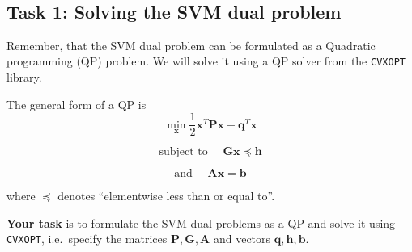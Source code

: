 \documentclass{article}
\begin{document}
    \begin{center}
    \end{center}
    { \hspace*{\fill} \\}
    
    \hypertarget{task-1-solving-the-svm-dual-problem}{%
\subsection{Task 1: Solving the SVM dual
problem}\label{task-1-solving-the-svm-dual-problem}}

    Remember, that the SVM dual problem can be formulated as a Quadratic
programming (QP) problem. We will solve it using a QP solver from the
\texttt{CVXOPT} library.

The general form of a QP is
\[\min_{\mathbf{x}} \frac{1}{2}\mathbf{x}^T \mathbf{P} \mathbf{x} + \mathbf{q}^T \mathbf{x}\]

\[\text{subject to } \quad \mathbf{G}\mathbf{x} \preceq \mathbf{h}\]

\[\text{and } \quad \mathbf{A}\mathbf{x} = \mathbf{b}\]

where \(\preceq\) denotes ``elementwise less than or equal to''.

\textbf{Your task} is to formulate the SVM dual problems as a QP and
solve it using \texttt{CVXOPT}, i.e.~specify the matrices
\(\mathbf{P}, \mathbf{G}, \mathbf{A}\) and vectors
\(\mathbf{q}, \mathbf{h}, \mathbf{b}\).
\end{document}
